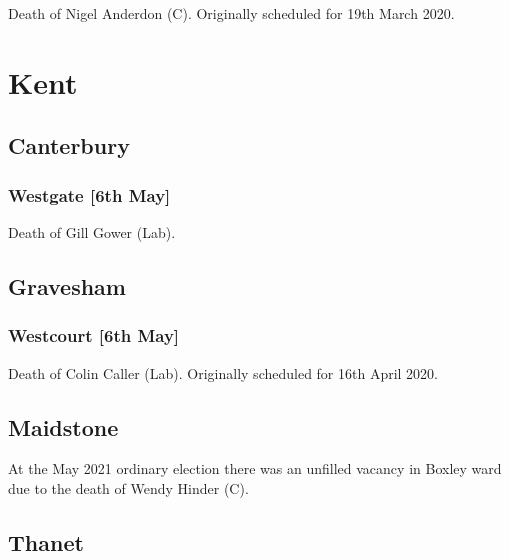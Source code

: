 \documentclass[a4paper,openany]{book}
\begin{document}
\begin{resultsiii}
Death of Nigel Anderdon (C).  Originally scheduled for 19th March 2020.

\section{Kent}

\subsection*{Canterbury}

\subsubsection*{Westgate \hspace*{\fill}\nolinebreak[1]%
	\enspace\hspace*{\fill}
	[6th May]}


Death of Gill Gower (Lab).

\subsection*{Gravesham}

\subsubsection*{Westcourt \hspace*{\fill}\nolinebreak[1]%
	\enspace\hspace*{\fill}
	[6th May]}


Death of Colin Caller (Lab).  Originally scheduled for 16th April 2020.

\subsection*{Maidstone}

At the May 2021 ordinary election there was an unfilled vacancy in Boxley ward due to the death of Wendy Hinder (C).

\subsection*{Thanet}


\end{resultsiii}
\end{document}
